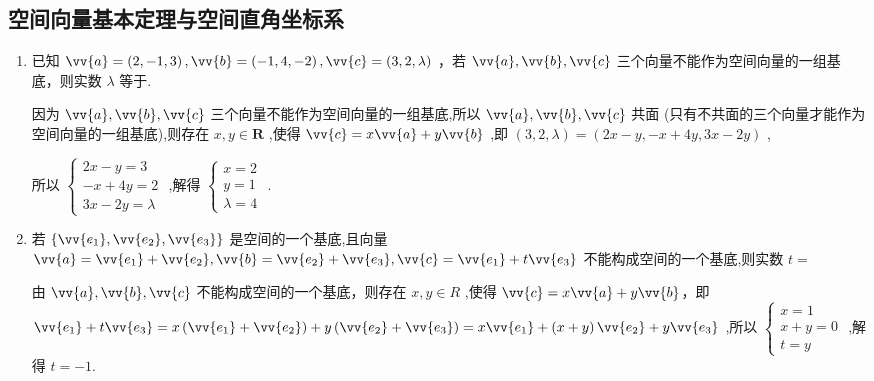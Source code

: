 \subsection*{空间向量基本定理与空间直角坐标系}
\begin{enumerate}
    \item 已知 $\vv{a} = \left( {2, - 1,3}\right) ,\vv{b} = \left( {-1,4, - 2}\right) ,\vv{c} = \left( {3,2,\lambda }\right)$ ，若 $\vv{a},\vv{b},\vv{c}$ 三个向量不能作为空间向量的一组基底，则实数 $\lambda$ 等于.
    \begin{jieda}
        因为 $\vv{a},\vv{b},\vv{c}$ 三个向量不能作为空间向量的一组基底,所以 $\vv{a},\vv{b},\vv{c}$ 共面 (只有不共面的三个向量才能作为空间向量的一组基底),则存在 $x,y \in  \mathbf{R}$ ,使得 $\vv{c} = x\vv{a} + y\vv{b}$ ,即 $\left( {3,2,\lambda }\right)  = \left( {{2x} - y, - x + {4y},{3x} - {2y}}\right)$ ,

        所以 $\left\{  \begin{array}{l} {2x} - y = 3 \\   - x + {4y} = 2 \\  {3x} - {2y} = \lambda  \end{array}\right.$ ,解得 $\left\{  \begin{array}{l} x = 2 \\  y = 1 \\  \lambda  = 4 \end{array}\right.$ .\end{jieda}

    \item 若 $\left\{  {\vv{{e}_{1}},\vv{{e}_{2}},\vv{{e}_{3}}}\right\}$ 是空间的一个基底,且向量 $\vv{a} = \vv{{e}_{1}} + \vv{{e}_{2}},\vv{b} = \vv{{e}_{2}} + \vv{{e}_{3}},\vv{c} = \vv{{e}_{1}} + t\vv{{e}_{3}}$ 不能构成空间的一个基底,则实数 $t =$
    \begin{jieda}
        由 $\vv{a},\vv{b},\vv{c}$ 不能构成空间的一个基底，则存在 $x,y \in  {R}$ ,使得 $\vv{c} = x\vv{a} + y\vv{b}$，即 $\vv{{e}_{1}} + t\vv{{e}_{3}} = x\left( {\vv{{e}_{1}} + \vv{{e}_{2}}}\right)  + y\left( {\vv{{e}_{2}} + \vv{{e}_{3}}}\right)  = x\vv{{e}_{1}} + \left( {x + y}\right) \vv{{e}_{2}} + y\vv{{e}_{3}}$ ,所以 $\left\{  \begin{array}{l} x = 1 \\  x + y = 0 \\  t = y \end{array}\right.$ ,解得 $t =  - 1$.
    \end{jieda}


\end{enumerate}
